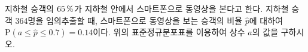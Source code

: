 \noindent\begin{minipage}[t]{0.58\linewidth}\vspace{0pt}\raggedright 지하철 승객의 $65\mkern3mu \%$가 지하철 안에서 스마트폰으로 동영상을 본다고 한다. 지하철 승객 364명을 임의추출할 때, 스마트폰으로 동영상을 보는 승객의 비율 $\hat{p}$에 대하여 $\mathrm{P}(a\le\hat{p}\le 0.7)=0.14$이다. 위의 표준정규분포표를 이용하여 상수 $a$의 값을 구하시오.\end{minipage}\hfill\begin{minipage}[t]{0.4\linewidth}\vspace{0pt}\centering \resizebox{\ifdim\width>\linewidth\linewidth\else\width\fi}{!}{}\end{minipage}\par
